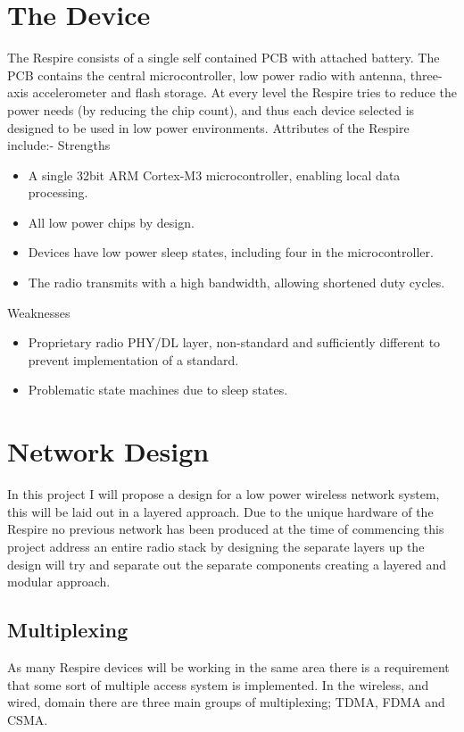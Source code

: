 \section{The Device}
The Respire consists of a single self contained PCB with attached battery. The PCB contains the
central microcontroller, low power radio with antenna, three-axis accelerometer and flash storage.
At every level the Respire tries to reduce the power needs (\eg by reducing the chip count), and thus
each device selected is designed to be used in low power environments. Attributes of the Respire
include:-
Strengths
\begin{itemize}
  \item A single 32bit ARM Cortex-M3 microcontroller, enabling local data processing.
  \item All low power chips by design.
  \item Devices have low power sleep states, including four in the microcontroller.
  \item The radio transmits with a high bandwidth, allowing shortened duty cycles.
\end{itemize}
Weaknesses
\begin{itemize}
  \item Proprietary radio PHY/DL layer, non-standard and sufficiently different to prevent implementation of a standard.
  \item Problematic state machines due to sleep states.
\end{itemize}

\section{Network Design}
In this project I will propose a design for a low power wireless network system, this will be laid out in
a layered approach. Due to the unique hardware of the Respire no previous network has been
produced at the time of commencing this project address an entire radio stack by designing the
separate layers up the design will try and separate out the separate components creating a layered
and modular approach.

\subsection{Multiplexing}
As many Respire devices will be working in the same area there is a requirement that some sort of
multiple access system is implemented. In the wireless, and wired, domain there are three main
groups of multiplexing; TDMA, FDMA and CSMA.

